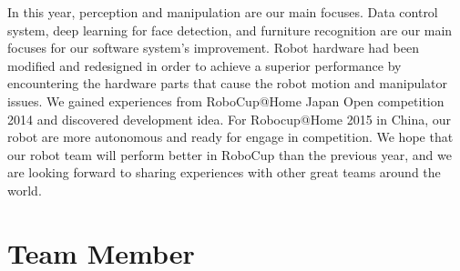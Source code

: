 \documentclass{llncs}
\begin{document}
In this year, perception and manipulation are our main focuses. Data control system, deep learning for face detection, and furniture recognition are our main focuses for our software system's improvement. Robot hardware had been modified and redesigned in order to achieve a superior performance by encountering the hardware parts that cause the robot motion and manipulator issues. We gained experiences from RoboCup@Home Japan Open competition 2014 and discovered development idea. For Robocup@Home 2015 in China, our robot are more autonomous and ready for engage in competition. We hope that our robot team will perform better in RoboCup than the previous year, and we are looking forward to sharing experiences with other great teams around the world.

\section*{Team Member}
\end{document}
